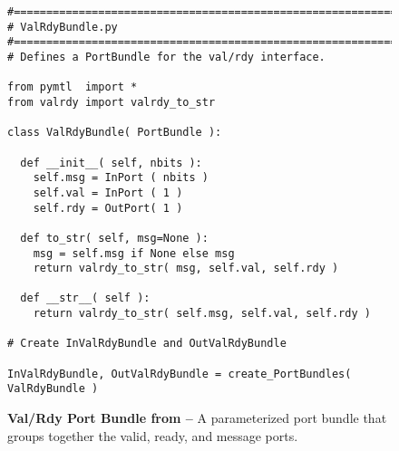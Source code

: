 
\begin{figure}

  \begin{lstlisting}[xleftmargin={0.9in}]
#=========================================================================
# ValRdyBundle.py
#=========================================================================
# Defines a PortBundle for the val/rdy interface.

from pymtl  import *
from valrdy import valrdy_to_str

class ValRdyBundle( PortBundle ):

  def __init__( self, nbits ):
    self.msg = InPort ( nbits )
    self.val = InPort ( 1 )
    self.rdy = OutPort( 1 )

  def to_str( self, msg=None ):
    msg = self.msg if None else msg
    return valrdy_to_str( msg, self.val, self.rdy )

  def __str__( self ):
    return valrdy_to_str( self.msg, self.val, self.rdy )

# Create InValRdyBundle and OutValRdyBundle

InValRdyBundle, OutValRdyBundle = create_PortBundles( ValRdyBundle )
\end{lstlisting}

  \caption{\textbf{Val/Rdy Port Bundle from  --} A
    parameterized port bundle that groups together the valid, ready, and
    message ports.}
  \label{code-tut3-gcd-port-bundle}

\end{figure}

